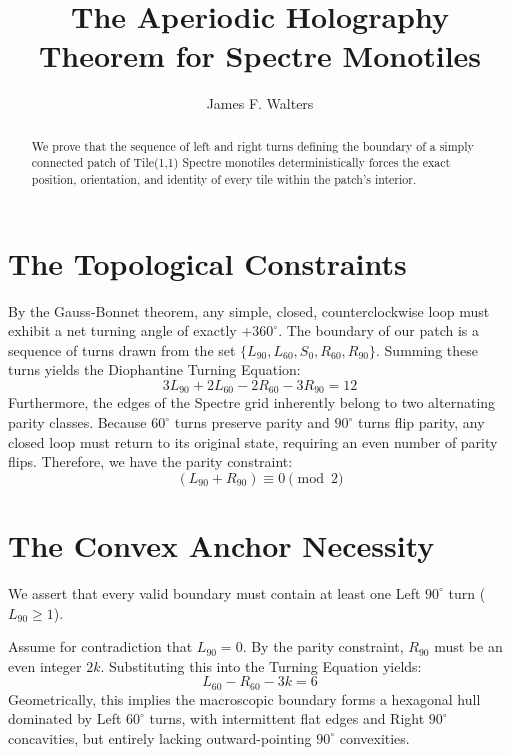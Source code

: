 \documentclass[11pt, a4paper]{amsart}
\title{The Aperiodic Holography Theorem for Spectre Monotiles}
\author{James F. Walters}
\begin{document}
\begin{abstract}
We prove that the sequence of left and right turns defining the boundary of a simply connected patch of Tile(1,1) Spectre monotiles deterministically forces the exact position, orientation, and identity of every tile within the patch's interior. 
\end{abstract}

\maketitle

\section{The Topological Constraints}
By the Gauss-Bonnet theorem, any simple, closed, counterclockwise loop must exhibit a net turning angle of exactly $+360^\circ$. The boundary of our patch is a sequence of turns drawn from the set $\{L_{90}, L_{60}, S_{0}, R_{60}, R_{90}\}$. Summing these turns yields the Diophantine Turning Equation:
\begin{equation}
3L_{90} + 2L_{60} - 2R_{60} - 3R_{90} = 12
\end{equation}
Furthermore, the edges of the Spectre grid inherently belong to two alternating parity classes. Because $60^\circ$ turns preserve parity and $90^\circ$ turns flip parity, any closed loop must return to its original state, requiring an even number of parity flips. Therefore, we have the parity constraint:
\begin{equation}
(L_{90} + R_{90}) \equiv 0 \pmod 2
\end{equation}

\section{The Convex Anchor Necessity}
We assert that every valid boundary must contain at least one Left $90^\circ$ turn ($L_{90} \ge 1$). 

Assume for contradiction that $L_{90} = 0$. By the parity constraint, $R_{90}$ must be an even integer $2k$. Substituting this into the Turning Equation yields:
\begin{equation}
L_{60} - R_{60} - 3k = 6
\end{equation}
Geometrically, this implies the macroscopic boundary forms a hexagonal hull dominated by Left $60^\circ$ turns, with intermittent flat edges and Right $90^\circ$ concavities, but entirely lacking outward-pointing $90^\circ$ convexities.
\end{document}
